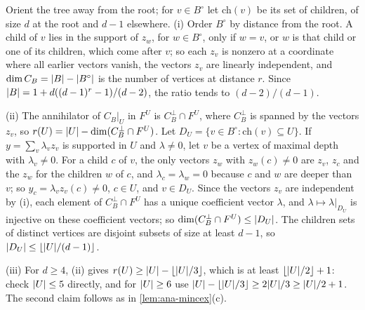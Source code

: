 \begin{informalproof}
Orient the tree away from the root; for $v\in B^\circ$ let $\mathrm{ch}(v)$ be its set of children, of size $d$ at the
root and $d-1$ elsewhere. (i) Order $B^\circ$ by distance from the root. A child of $v$ lies in the support of $z_w$, for
$w\in B^\circ$, only if $w=v$, or $w$ is that child or one of its children, which come after $v$; so each $z_v$ is
nonzero at a coordinate where all earlier vectors vanish, the vectors $z_v$ are linearly independent, and
$\dim C_B=\lvert B \rvert-\lvert B^\circ \rvert$ is the number of vertices at distance $r$. Since $\lvert B \rvert=1+d((d-1)^r-1)/(d-2)$, the
ratio tends to $(d-2)/(d-1)$.

(ii) The annihilator of $C_B|_U$ in $F^U$ is $C_B^\perp\cap F^U$, where $C_B^\perp$ is spanned by the vectors $z_v$, so
$r(U)=\lvert U \rvert-\dim(C_B^\perp\cap F^U)$. Let $D_U=\{v\in B^\circ:\mathrm{ch}(v)\subseteq U\}$. If
$y=\sum_v\lambda_vz_v$ is supported in $U$ and $\lambda\ne0$, let $v$ be a vertex of maximal depth with $\lambda_v\ne0$.
For a child $c$ of $v$, the only vectors $z_w$ with $z_w(c)\ne0$ are $z_v$, $z_c$ and the $z_w$ for the children $w$ of
$c$, and $\lambda_c=\lambda_w=0$ because $c$ and $w$ are deeper than $v$; so $y_c=\lambda_vz_v(c)\ne0$, $c\in U$, and
$v\in D_U$. Since the vectors $z_v$ are independent by (i), each element of $C_B^\perp\cap F^U$ has a unique coefficient
vector $\lambda$, and $\lambda\mapsto\lambda|_{D_U}$ is injective on these coefficient vectors; so
$\dim(C_B^\perp\cap F^U)\le\lvert D_U \rvert$. The children sets of distinct vertices are disjoint subsets of size at least
$d-1$, so $\lvert D_U \rvert\le\lfloor\lvert U \rvert/(d-1)\rfloor$.

(iii) For $d\ge4$, (ii) gives $r(U)\ge\lvert U \rvert-\lfloor\lvert U \rvert/3\rfloor$, which is at least $\lfloor\lvert U \rvert/2\rfloor+1$:
check $\lvert U \rvert\le5$ directly, and for $\lvert U \rvert\ge6$ use $\lvert U \rvert-\lfloor\lvert U \rvert/3\rfloor\ge2\lvert U \rvert/3\ge\lvert U \rvert/2+1$.
The second claim follows as in \cref{lem:ana-mincex}(c).
\end{informalproof}

